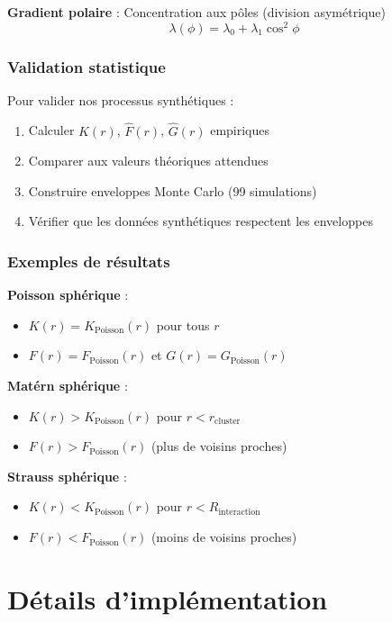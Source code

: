 \textbf{Gradient polaire} : Concentration aux pôles (division asymétrique)
\[
\lambda(\phi) = \lambda_0 + \lambda_1 \cos^2\phi
\]

\subsection{Validation statistique}

Pour valider nos processus synthétiques :

\begin{enumerate}
    \item Calculer $\hat{K}(r)$, $\hat{F}(r)$, $\hat{G}(r)$ empiriques
    \item Comparer aux valeurs théoriques attendues
    \item Construire enveloppes Monte Carlo (99 simulations)
    \item Vérifier que les données synthétiques respectent les enveloppes
\end{enumerate}

\subsection{Exemples de résultats}

\textbf{Poisson sphérique} : 
\begin{itemize}
    \item $K(r) = K_{\text{Poisson}}(r)$ pour tous $r$
    \item $F(r) = F_{\text{Poisson}}(r)$ et $G(r) = G_{\text{Poisson}}(r)$
\end{itemize}

\textbf{Matérn sphérique} : 
\begin{itemize}
    \item $K(r) > K_{\text{Poisson}}(r)$ pour $r < r_{\text{cluster}}$
    \item $F(r) > F_{\text{Poisson}}(r)$ (plus de voisins proches)
\end{itemize}

\textbf{Strauss sphérique} : 
\begin{itemize}
    \item $K(r) < K_{\text{Poisson}}(r)$ pour $r < R_{\text{interaction}}$
    \item $F(r) < F_{\text{Poisson}}(r)$ (moins de voisins proches)
\end{itemize}

\chapter{Détails d'implémentation}

